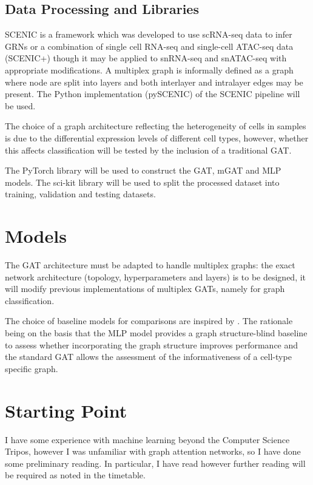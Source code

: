 \documentclass[12pt,a4paper]{report}
\begin{document}
\subsection{Data Processing and Libraries}
SCENIC is a framework which was developed to use scRNA-seq data to infer GRNs or a combination of single cell RNA-seq and single-cell ATAC-seq data (SCENIC+) though it may be applied to snRNA-seq and snATAC-seq with appropriate modifications. A multiplex graph is informally defined as a graph where node are split into
layers and both interlayer and intralayer edges may be present. The Python implementation (pySCENIC) of the SCENIC pipeline will be used. 

The choice of a graph architecture reflecting the heterogeneity of cells in samples is due to the differential expression levels of different cell types, however, whether this affects classification
will be tested by the inclusion of a traditional GAT. 

The PyTorch library will be used to construct the GAT, mGAT and MLP models. The sci-kit library will be used to split the processed
dataset into training, validation and testing datasets.

\section{Models}
The GAT architecture must be adapted to handle multiplex graphs: the exact network architecture (topology, hyperparameters and layers) is to be designed, it will modify previous implementations
of multiplex GATs, namely \parencite{bongiovanniMPXGATAttentionBased2024} for graph classification.

The choice of baseline models for comparisons are inspired by \citeauthor{luzhnicaGraphClassificationNetworks2019}. The
rationale being on the basis that the MLP model provides a graph structure-blind baseline to assess
whether incorporating the graph structure improves performance and the standard GAT allows the assessment of the informativeness of a cell-type specific graph.

\section{Starting Point}
I have some experience with machine learning beyond the Computer Science Tripos, however I was  unfamiliar with graph attention networks, so I have done some preliminary reading. In particular, I have read \cite{ravindraDiseaseStatePrediction2020,tieriNetworkInferenceReconstruction2019,velickovicGraphAttentionNetworks2017,xingMultilevelAttentionGraph2022} however further reading will be required as noted in the timetable. 
\end{document}
